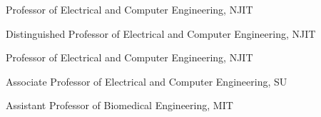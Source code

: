 



{Professor of Electrical and Computer Engineering, NJIT}

{Distinguished Professor of Electrical and Computer Engineering, NJIT}

{Professor of Electrical and Computer Engineering, NJIT}
 
{Associate Professor of Electrical and Computer Engineering, SU}

{Assistant Professor of Biomedical Engineering, MIT}      

    
       


